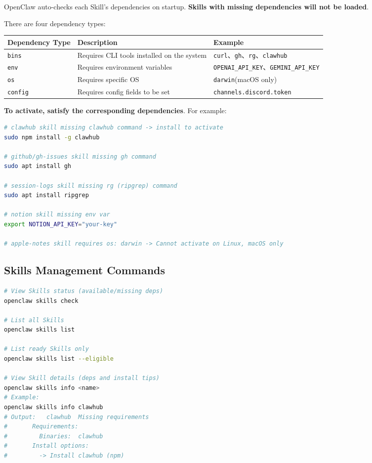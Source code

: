OpenClaw auto-checks each Skill's dependencies on startup. \textbf{Skills with missing dependencies will not be loaded}.

There are four dependency types:

\begin{table}[h]
\centering
\small
\begin{tabular}{|l|l|l|}
\hline
Dependency Type & Description & Example \\
\hline
\texttt{bins} & Requires CLI tools installed on the system & \texttt{curl}、\texttt{gh}、\texttt{rg}、\texttt{clawhub} \\
\hline
\texttt{env} & Requires environment variables & \texttt{OPENAI\_API\_KEY}、\texttt{GEMINI\_API\_KEY} \\
\hline
\texttt{os} & Requires specific OS & \texttt{darwin}(macOS only) \\
\hline
\texttt{config} & Requires config fields to be set & \texttt{channels.discord.token} \\
\hline
\end{tabular}
\end{table}

\textbf{To activate, satisfy the corresponding dependencies}. For example:

\begin{lstlisting}[language=bash]
# clawhub skill missing clawhub command -> install to activate
sudo npm install -g clawhub

# github/gh-issues skill missing gh command
sudo apt install gh

# session-logs skill missing rg (ripgrep) command
sudo apt install ripgrep

# notion skill missing env var
export NOTION_API_KEY="your-key"

# apple-notes skill requires os: darwin -> Cannot activate on Linux, macOS only
\end{lstlisting}

\subsection{Skills Management Commands}


\begin{lstlisting}[language=bash]
# View Skills status (available/missing deps)
openclaw skills check

# List all Skills
openclaw skills list

# List ready Skills only
openclaw skills list --eligible

# View Skill details (deps and install tips)
openclaw skills info <name>
# Example: 
openclaw skills info clawhub
# Output:   clawhub  Missing requirements
#       Requirements:
#         Binaries:  clawhub
#       Install options:
#         -> Install clawhub (npm)
\end{lstlisting}

